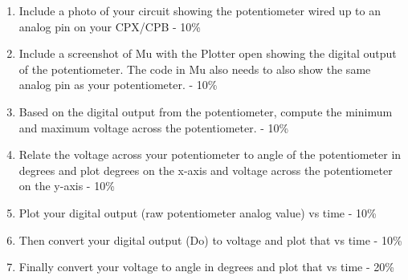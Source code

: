

\begin{enumerate}[itemsep=-5pt]
\item Include a photo of your circuit showing the potentiometer wired up to an analog pin on your CPX/CPB - 10\%
\item Include a screenshot of Mu with the Plotter open showing the digital output of the potentiometer. The code in Mu also needs to also show the same analog pin as your potentiometer. - 10\%
\item Based on the digital output from the potentiometer, compute the minimum and maximum voltage across the potentiometer. - 10\%
\item Relate the voltage across your potentiometer to angle of the potentiometer in degrees and plot degrees on the x-axis and voltage across the potentiometer on the y-axis - 10\%
\item Plot your digital output (raw potentiometer analog value) vs time - 10\%
\item Then convert your digital output (Do) to voltage and plot that vs time - 10\% 
\item Finally convert your voltage to angle in degrees and plot that vs time - 20\%
\end{enumerate}
